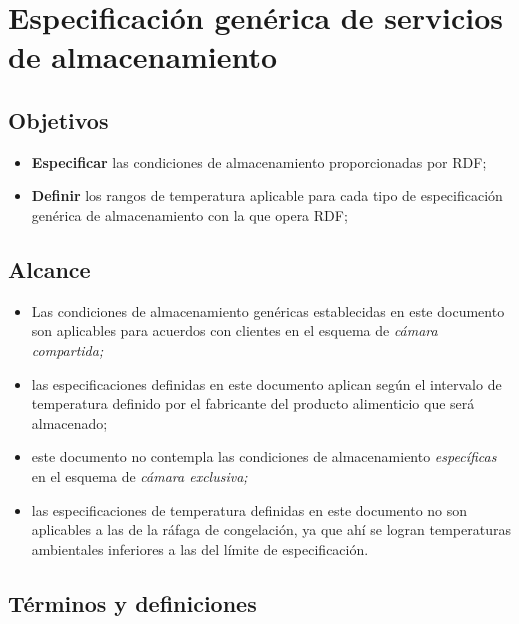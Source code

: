 \thispagestyle{formato-PI}
\renewcommand{\MayorVer}{2}
\renewcommand{\MenorVer}{0}
\renewcommand{\Codigo}{PSA-9-ESP} %
\renewcommand{\FechaPub}{2023--01}
\renewcommand{\TipoID}{ESP}
\renewcommand{\Titulo}{Especificación genérica de servicios de almacenamiento}

\section{\Titulo}\label{esp:generica}
\renewcommand{\Codigo}{\Prog--\thesection--\TipoID}

\subsection{Objetivos}

\begin{itemize}
	\item \textbf{Especificar} las condiciones de almacenamiento proporcionadas por \gls{RDF};
	\item \textbf{Definir} los rangos de temperatura aplicable para cada tipo de especificación genérica de almacenamiento con la que opera \gls{RDF};
\end{itemize}

\subsection{Alcance}

\begin{itemize}
	\item Las condiciones de almacenamiento genéricas establecidas en este documento son aplicables para acuerdos con clientes en el esquema de \emph{cámara compartida;}
	\item las especificaciones definidas en este documento aplican según el intervalo de temperatura definido por el fabricante del producto alimenticio que será almacenado;
	\item este documento no contempla las condiciones de almacenamiento \emph{específicas} en el esquema de \emph{cámara exclusiva;}
	\item las especificaciones de temperatura definidas en este documento no son aplicables a las de la ráfaga de congelación, ya que ahí se logran temperaturas ambientales inferiores a las del límite de especificación.
\end{itemize}

\subsection{Términos y definiciones}


